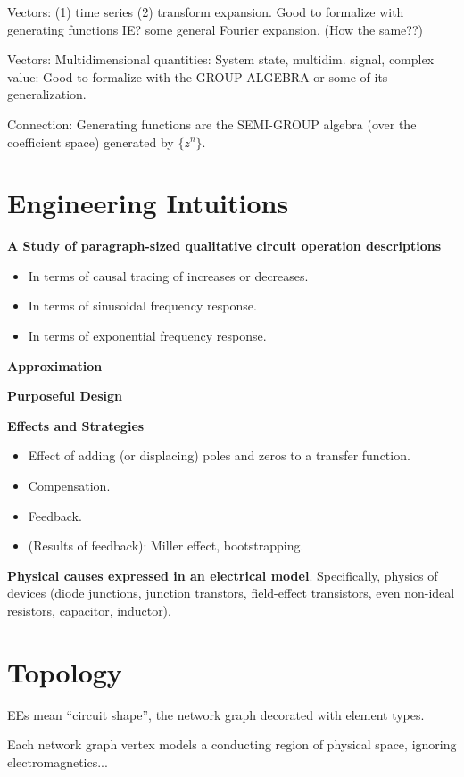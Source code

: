 \documentclass{article}
\begin{document}
Vectors: (1) time series (2) transform expansion.  Good to formalize with
generating functions IE? some general Fourier expansion.  (How the same??)

Vectors: Multidimensional quantities: System state, multidim. signal, complex
value:  Good to formalize with the GROUP ALGEBRA or some of its generalization.

Connection:  Generating functions are the 
SEMI-GROUP algebra (over the coefficient space)
generated by $\{ z^n \}$.


\section{Engineering Intuitions}


\textbf{A Study of paragraph-sized qualitative circuit operation descriptions}
\begin{itemize}
\item In terms of causal tracing of increases or decreases.
\item In terms of sinusoidal frequency response.
\item In terms of exponential frequency response.
\end{itemize}

\textbf{Approximation}

\textbf{Purposeful Design}

\textbf{Effects and Strategies}
\begin{itemize}
\item Effect of adding (or displacing) poles and zeros to a transfer function.
\item Compensation.
\item Feedback.
\item (Results of feedback): Miller effect, bootstrapping.
\end{itemize}

\textbf{Physical causes expressed in an electrical model}.  Specifically, 
physics of devices (diode junctions, junction transtors, 
field-effect transistors, even non-ideal resistors, capacitor, inductor).

\section{Topology}

EEs mean ``circuit shape'', the network graph decorated with 
element types.

Each network graph vertex models a conducting region of physical space, 
ignoring electromagnetics...
\end{document}
